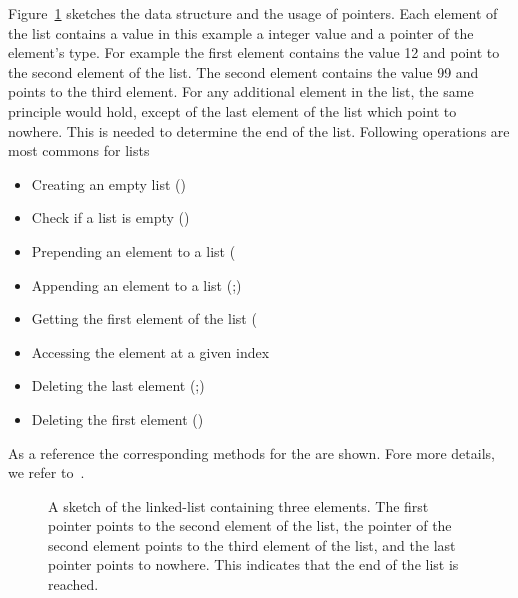 \documentclass[11pt,fleqn]{book} %
\begin{document}
Figure~\ref{fig:sketch:linked:list} sketches the data structure and the usage of pointers. Each element of the list contains a value in this example a integer value and a pointer of the element's type. For example the first element contains the value 12 and point to the second element of the list. The second element contains the value 99 and points to the third element. For any additional element in the list, the same principle would hold, except of the last element of the list which point to nowhere. This is needed to determine the end of the list. Following operations are most commons for lists
\vspace{0.25cm}
\begin{itemize}
\item Creating an empty list ()
\item Check if a list is empty ()
\item Prepending an element to a list (
\item Appending an element to a list (;)
\item Getting the first element of the list (
\item Accessing the element at a given index 
\item Deleting the last element (;)
\item Deleting the first element ()
\end{itemize}
\vspace{0.25cm}
As a reference the corresponding methods for the  are shown. Fore more details, we refer to~\cite[Chapter 2]{knuth1997art}.

\begin{figure}[tbp]
\centering
{}
\caption{A sketch of the linked-list containing three elements. The first pointer points to the second element of the list, the pointer of the second element points to the third element of the list, and the last pointer points to nowhere. This indicates that the end of the list is reached.}
\label{fig:sketch:linked:list}
\end{figure}
\end{document}
